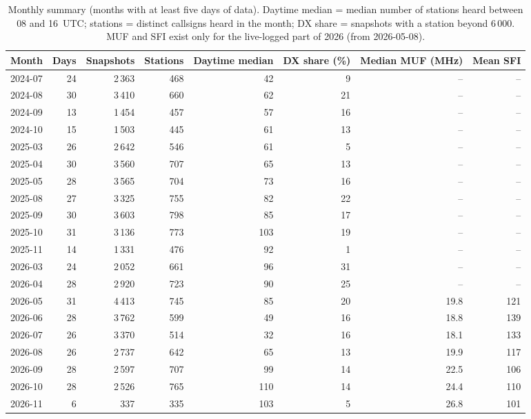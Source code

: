 \begin{table}[htbp]\centering\small
\caption{Monthly summary (months with at least five days of data). Daytime median = median number of stations heard between 08 and 16~UTC; stations = distinct callsigns heard in the month; DX share = snapshots with a station beyond 6\,000\km. MUF and SFI exist only for the live-logged part of 2026 (from 2026-05-08).}\label{tab:months}
\begin{tabular}{lrrrrrrr}
\toprule
Month & Days & Snapshots & Stations & Daytime median & DX share (\%) & Median MUF (MHz) & Mean SFI \\
\midrule
2024-07 & 24 & 2\,363 & 468 & 42 & 9 & -- & -- \\
2024-08 & 30 & 3\,410 & 660 & 62 & 21 & -- & -- \\
2024-09 & 13 & 1\,454 & 457 & 57 & 16 & -- & -- \\
2024-10 & 15 & 1\,503 & 445 & 61 & 13 & -- & -- \\
2025-03 & 26 & 2\,642 & 546 & 61 & 5 & -- & -- \\
2025-04 & 30 & 3\,560 & 707 & 65 & 13 & -- & -- \\
2025-05 & 28 & 3\,565 & 704 & 73 & 16 & -- & -- \\
2025-08 & 27 & 3\,325 & 755 & 82 & 22 & -- & -- \\
2025-09 & 30 & 3\,603 & 798 & 85 & 17 & -- & -- \\
2025-10 & 31 & 3\,136 & 773 & 103 & 19 & -- & -- \\
2025-11 & 14 & 1\,331 & 476 & 92 & 1 & -- & -- \\
2026-03 & 24 & 2\,052 & 661 & 96 & 31 & -- & -- \\
2026-04 & 28 & 2\,920 & 723 & 90 & 25 & -- & -- \\
2026-05 & 31 & 4\,413 & 745 & 85 & 20 & 19.8 & 121 \\
2026-06 & 28 & 3\,762 & 599 & 49 & 16 & 18.8 & 139 \\
2026-07 & 26 & 3\,370 & 514 & 32 & 16 & 18.1 & 133 \\
2026-08 & 26 & 2\,737 & 642 & 65 & 13 & 19.9 & 117 \\
2026-09 & 28 & 2\,597 & 707 & 99 & 14 & 22.5 & 106 \\
2026-10 & 28 & 2\,526 & 765 & 110 & 14 & 24.4 & 110 \\
2026-11 & 6 & 337 & 335 & 103 & 5 & 26.8 & 101 \\
\bottomrule
\end{tabular}
\end{table}
